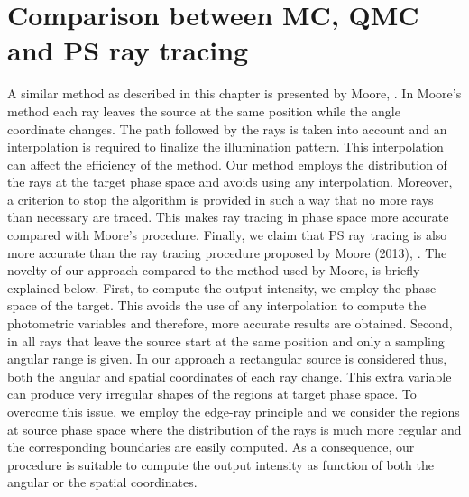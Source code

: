 \section{Comparison between MC, QMC and PS ray tracing}


\indent A similar method as described in this chapter is presented by Moore, \cite{moore2013methods}. In Moore's method each ray leaves the source at the same position while the angle coordinate changes. The path followed by the rays is taken into account and an interpolation is required to finalize the illumination pattern.
 This interpolation can affect the efficiency of the method. Our method employs the distribution of the rays at the target phase space and avoids using any interpolation. 
Moreover, a criterion to stop the algorithm is provided in such a way that no more rays than necessary are traced. This makes ray tracing in phase space more accurate compared with Moore's procedure.
 Finally, we claim that PS ray tracing is also more accurate than the ray tracing procedure proposed by Moore (2013), \cite{moore2013methods}.
The novelty of our approach compared to the method used by Moore, is briefly explained below.
First, to compute the output intensity, we employ the phase space of the target. This avoids the use of any interpolation to compute the photometric variables and therefore, more accurate results are obtained.
Second, in \cite{moore2013methods} all rays that leave the source start at the same position and only a sampling angular range is given. In our approach a rectangular source is considered thus, both the angular and spatial coordinates of each ray change. This extra variable can produce very irregular shapes of the regions at target phase space. To overcome this issue, we employ the edge-ray principle and we consider the regions at source phase space where the distribution of the rays is much more regular and the corresponding boundaries are easily computed.
As a consequence, our procedure is suitable to compute the output intensity as function of both the angular or the spatial coordinates.




